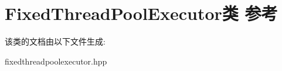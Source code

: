 \hypertarget{classFixedThreadPoolExecutor}{}\section{Fixed\+Thread\+Pool\+Executor类 参考}
\label{classFixedThreadPoolExecutor}


该类的文档由以下文件生成\+:\begin{DoxyCompactItemize}
\item 
fixedthreadpoolexecutor.\+hpp\end{DoxyCompactItemize}
